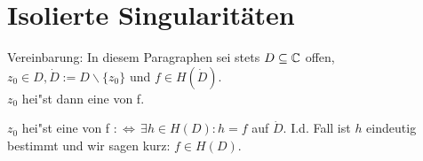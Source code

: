 \documentclass[a4paper,twoside,DIV15,BCOR12mm]{scrbook}
\begin{document}
%
%



\chapter{Isolierte Singularitäten}

Vereinbarung: In diesem Paragraphen sei stets $D \subseteq \mathbb{C}$ offen, $z_0 \in D, \dot{D} := D \backslash \{z_0\}$ und $f \in H(\dot{D})$.\\
$z_0$ hei"st dann eine  von f.

\begin{definition}
$z_0$ hei"st eine  von f $:\Leftrightarrow \, \exists h\in H(D): h=f$ auf $\dot{D}$. I.d. Fall ist $h$ eindeutig bestimmt und wir sagen kurz: $f \in H(D)$.
\end{definition}
\end{document}
